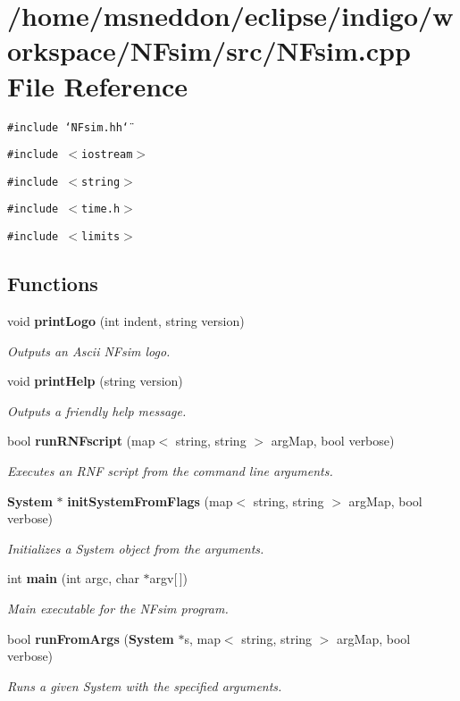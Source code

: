 \section{/home/msneddon/eclipse/indigo/workspace/NFsim/src/NFsim.cpp File Reference}
\label{NFsim_8cpp}


{\tt \#include \char`\"{}NFsim.hh\char`\"{}}\par
{\tt \#include $<$iostream$>$}\par
{\tt \#include $<$string$>$}\par
{\tt \#include $<$time.h$>$}\par
{\tt \#include $<$limits$>$}\par
\subsection*{Functions}
\begin{CompactItemize}
\item 
void {\bf printLogo} (int indent, string version)
\begin{CompactList}\small\item\em Outputs an Ascii NFsim logo. \item\end{CompactList}\item 
void {\bf printHelp} (string version)
\begin{CompactList}\small\item\em Outputs a friendly help message. \item\end{CompactList}\item 
bool {\bf runRNFscript} (map$<$ string, string $>$ argMap, bool verbose)
\begin{CompactList}\small\item\em Executes an RNF script from the command line arguments. \item\end{CompactList}\item 
{\bf System} $\ast$ {\bf initSystemFromFlags} (map$<$ string, string $>$ argMap, bool verbose)
\begin{CompactList}\small\item\em Initializes a System object from the arguments. \item\end{CompactList}\item 
int {\bf main} (int argc, char $\ast$argv[$\,$])
\begin{CompactList}\small\item\em Main executable for the NFsim program. \item\end{CompactList}\item 
bool {\bf runFromArgs} ({\bf System} $\ast$s, map$<$ string, string $>$ argMap, bool verbose)
\begin{CompactList}\small\item\em Runs a given System with the specified arguments. \item\end{CompactList}\end{CompactItemize}


